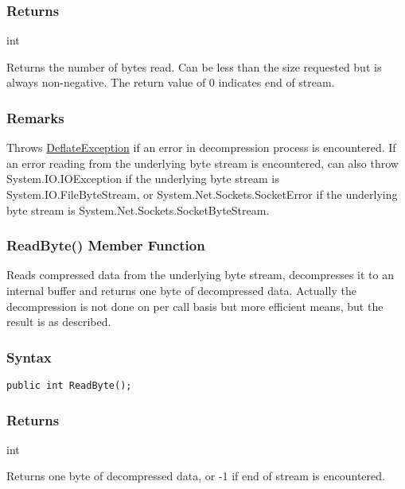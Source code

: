 \documentclass[a4paper,oneside,11.000000pt]{book}
\begin{document}
\subsubsection*{Returns}int
\begin{flushleft}
Returns the number of bytes read. Can be less than the size requested but is always non-negative.
The return value of 0 indicates end of stream.

\end{flushleft}
\subsubsection*{Remarks}
\begin{flushleft}
Throws \hyperlink{System.IO.Compression.DeflateException}{DeflateException} if an error in decompression process is encountered.
If an error reading from the underlying byte stream is encountered,
can also throw System.\-IO.\-IOException if the underlying byte stream is System.\-IO.\-FileByteStream, or
System.\-Net.\-Sockets.\-SocketError if the underlying byte stream is System.\-Net.\-Sockets.\-SocketByteStream.

\end{flushleft}
\clearpage

\hypertarget{System.IO.Compression.DeflateStream.ReadByte.P.System.IO.Compression.DeflateStream}{\subsubsection*{ReadByte() Member Function}}
\begin{flushleft}
Reads compressed data from the underlying byte stream, decompresses it to an internal buffer
and returns one byte of decompressed data.
Actually the decompression is not done on per call basis but more efficient means, but
the result is as described.

\end{flushleft}
\subsubsection*{Syntax}\texttt{public int ReadByte();}
\subsubsection*{Returns}
int
\begin{flushleft}
Returns one byte of decompressed data, or -1 if end of stream is encountered.

\end{flushleft}
\end{document}
